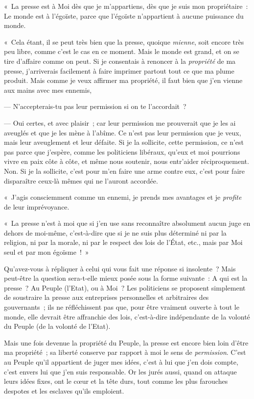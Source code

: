 \documentclass[french,twoside]{book} %
\begin{document}
« La presse est à Moi dès que je m’appartiens, dès que je suis mon propriétaire : Le monde est à l’égoïste, parce que l’égoïste n’appartient à aucune puissance du monde.\par
« Cela étant, il se peut très bien que la presse, quoique \emph{mienne}, soit encore très peu libre, comme c’est le cas en ce moment. Mais le monde est grand, et on se tire d’affaire comme on peut. Si je consentais à renoncer à la \emph{propriété} de ma presse, j’arriverais facilement à faire imprimer partout tout ce que ma plume produit. Mais comme je veux affirmer ma propriété, il faut bien que j’en vienne aux mains avec mes ennemis,\par
— N’accepterais-tu pas leur permission si on te l’accordait ?\par
— Oui certes, et avec plaisir ; car leur permission me prouverait que je les ai aveuglés et que je les mène à l’abîme. Ce n’est pas leur permission que je veux, mais leur aveuglement et leur défaite. Si je la sollicite, cette permission, ce n’est pas parce que j’espère, comme les politiciens libéraux, qu’eux et moi pourrions vivre en paix côte à côte, et même nous soutenir, nous entr’aider réciproquement. Non. Si je la sollicite, c’est pour m’en faire une arme contre eux, c’est pour faire disparaître ceux-là mêmes qui ne l’auront accordée.\par
« J’agis consciemment comme un ennemi, je prends mes avantages et je \emph{profite} de leur imprévoyance.\par
« La presse n’est à moi que si j’en use sans reconnaître absolument aucun juge en dehors de moi-même, c’est-à-dire que si je ne suis plus déterminé ni par la religion, ni par la morale, ni par le respect des lois de l’État, etc., mais par Moi seul et par mon égoïsme ! »\par
Qu’avez-vous à répliquer à celui qui vous fait une réponse si insolente ? Mais peut-être la question sera-t-elle mieux posée sous la forme suivante : A qui est  la presse ? Au Peuple (l’Etat), ou à Moi ? Les politiciens se proposent simplement de soustraire la presse aux entreprises personnelles et arbitraires des gouvernants ; ils ne réfléchissent pas que, pour être vraiment ouverte à tout le monde, elle devrait être affranchie des lois, c’est-à-dire indépendante de la volonté du Peuple (de la volonté de l’Etat).\par
Mais une fois devenue la propriété du Peuple, la presse est encore bien loin d’être ma propriété ; sa liberté conserve par rapport à moi le sens de \emph{permission}. C’est au Peuple qu’il appartient de juger mes idées, c’est à lui que j’en dois compte, c’est envers lui que j’en suis responsable. Or les jurés aussi, quand on attaque leurs idées fixes, ont le cœur et la tête durs, tout comme les plus farouches despotes et les esclaves qu’ils emploient.\par
\end{document}
